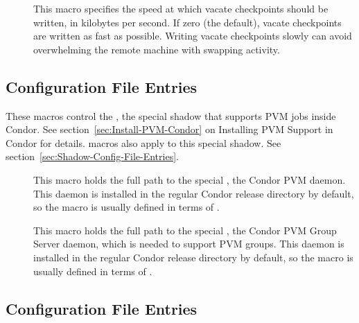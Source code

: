 \begin{description}
\item[] \label{param:SlowCkptSpeed}  This
  macro specifies the speed at which vacate checkpoints should be
  written, in kilobytes per second.  If zero (the default), vacate
  checkpoints are written as fast as possible.  Writing vacate
  checkpoints slowly can avoid overwhelming the remote machine with
  swapping activity.

\end{description}

\subsection{\label{sec:Shadow-PVM-Config-File-Entries}
Configuration File Entries}

These macros control the , the special shadow
that supports PVM jobs inside Condor.  See
section~\ref{sec:Install-PVM-Condor} on Installing PVM Support in
Condor for details.   macros also apply to this
special shadow.  See section~\ref{sec:Shadow-Config-File-Entries}.
\begin{description}

\item[] \label{param:PvmD}  This macro holds the full path
  to the special , the Condor PVM daemon.  This daemon is
  installed in the regular Condor release directory by default, so the
  macro is usually defined in terms of .
  
\item[] \label{param:PvmGS} This macro holds the full
  path to the special , the Condor PVM Group Server
  daemon, which is needed to support PVM groups.  This daemon is
  installed in the regular Condor release directory by default, so the
  macro is usually defined in terms of .

\end{description}

\subsection{\label{sec:Starter-Config-File-Entries}
Configuration File Entries}


